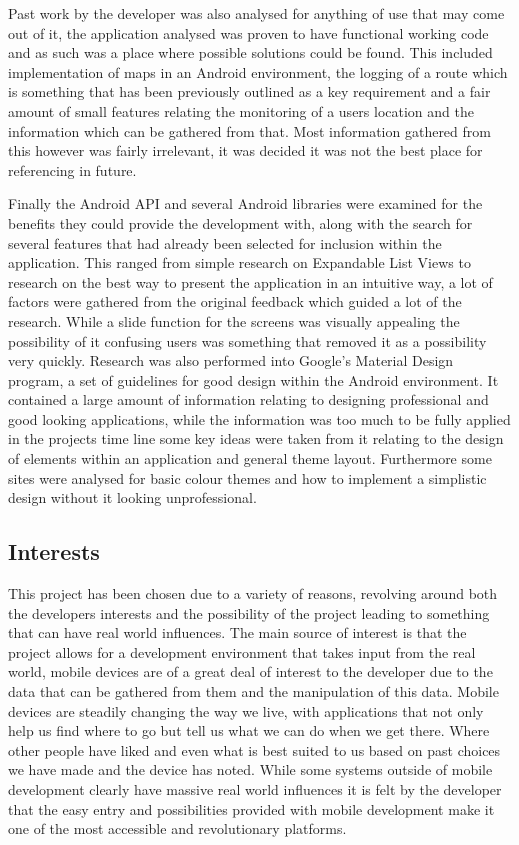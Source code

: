 Past work by the developer was also analysed for anything of use that may come out of it, the application analysed was proven to have functional working code and as such was a place where possible solutions could be found. This included implementation of maps in an Android environment, the logging of a route which is something that has been previously outlined as a key requirement and a fair amount of small features relating the monitoring of a users location and the information which can be gathered from that. Most information gathered from this however was fairly irrelevant, it was decided it was not the best place for referencing in future. 

Finally the Android API and several Android libraries were examined for the benefits they could provide the development with, along with the search for several features that had already been selected for inclusion within the application. This ranged from simple research on Expandable List Views to research on the best way to present the application in an intuitive way, a lot of factors were gathered from the original feedback which guided a lot of the research. While a slide function for the screens was visually appealing the possibility of it confusing users was something that removed it as a possibility very quickly. Research was also performed into Google's Material Design program, a set of guidelines for good design within the Android environment. It contained a large amount of information relating to designing professional and good looking applications, while the information was too much to be fully applied in the projects time line some key ideas were taken from it relating to the design of elements within an application and general theme layout. Furthermore some sites were analysed for basic colour themes and how to implement a simplistic design without it looking unprofessional.
\subsection{Interests}
This project has been chosen due to a variety of reasons, revolving around both the developers interests and the possibility of the project leading to something that can have real world influences. The main source of interest is that the project allows for a development environment that takes input from the real world, mobile devices are of a great deal of interest to the developer due to the data that can be gathered from them and the manipulation of this data. Mobile devices are steadily changing the way we live, with applications that not only help us find where to go but tell us what we can do when we get there. Where other people have liked and even what is best suited to us based on past choices we have made and the device has noted. While some systems outside of mobile development clearly have massive real world influences it is felt by the developer that the easy entry and possibilities provided with mobile development make it one of the most accessible and revolutionary platforms.

